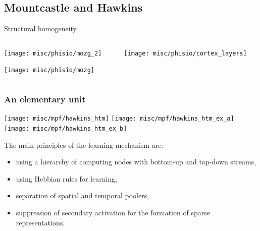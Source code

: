 \documentclass[default]{beamer}
\begin{document}
	\subsection{Mountcastle and Hawkins}
	\begin{frame}{Structural homogeneity}
		
		\begin{columns}
			\begin{column}{0.35\textwidth}
				\texttt{[image: misc/phisio/mozg\_2]}
				\par\bigskip
				\hspace{-7mm}\texttt{[image: misc/phisio/mozg]}
			\end{column}
			\begin{column}{0.65\textwidth}
				\texttt{[image: misc/phisio/cortex\_layers]}
			\end{column}
		\end{columns}
		\nocite{*}
		\printbibliography[keyword={column}, resetnumbers=true]
	\end{frame}
	\begin{frame}
		\frametitle{An elementary unit}
		\scriptsize
		
		\begin{center}
			\texttt{[image: misc/mpf/hawkins\_htm]}
			\texttt{[image: misc/mpf/hawkins\_htm\_ex\_a]}
			\texttt{[image: misc/mpf/hawkins\_htm\_ex\_b]}
		\end{center}
		The main principles of the learning mechanism are: 
		
		\begin{itemize}
			\item using a hierarchy of computing nodes with bottom-up and top-down streams, 
			\item using Hebbian rules for learning, 
			\item separation of spatial and temporal poolers, 
			\item suppression of secondary activation for the formation of sparse representations.
		\end{itemize}
		\vspace{-5pt}
		\nocite{*}
		\printbibliography[keyword={htm}, resetnumbers=true]
	\end{frame}
\end{document}

